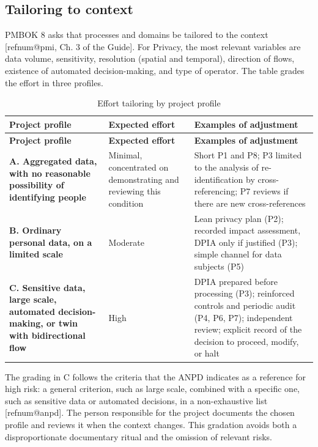 \documentclass[11pt,a4paper]{article}
\makeatletter
\newcommand{\refnum}[1]{\csname refnum@#1\endcsname}
\newcommand{\cit}[1]{[\refnum{#1}]}
\newcommand{\SingleSpacing}{}
\newcommand{\fontetab}[1]{\par\vspace{3pt}{\small\noindent Source: #1\par}}
\makeatother
\begin{document}
\subsection{Tailoring to context}

PMBOK 8 asks that processes and domains be tailored to the context [\refnum{pmi}, Ch. 3 of the Guide]. For Privacy, the most relevant variables are data volume, sensitivity, resolution (spatial and temporal), direction of flows, existence of automated decision-making, and type of operator. The table grades the effort in three profiles.

\begingroup\SingleSpacing\small
\begin{longtable}{@{}>{\raggedright\arraybackslash}p{}>{\raggedright\arraybackslash}p{}>{\raggedright\arraybackslash}p{}@{}}
\caption{Effort tailoring by project profile}\label{tab:t5}\\
\toprule
\textbf{Project profile} & \textbf{Expected effort} & \textbf{Examples of adjustment}\\
\midrule
\endfirsthead
\toprule
\textbf{Project profile} & \textbf{Expected effort} & \textbf{Examples of adjustment}\\
\midrule
\endhead
\bottomrule
\endfoot
\bottomrule
\endlastfoot
\textbf{A. Aggregated data, with no reasonable possibility of identifying people} & Minimal, concentrated on demonstrating and reviewing this condition & Short P1 and P8; P3 limited to the analysis of re-identification by cross-referencing; P7 reviews if there are new cross-references\\[3pt]
\textbf{B. Ordinary personal data, on a limited scale} & Moderate & Lean privacy plan (P2); recorded impact assessment, DPIA only if justified (P3); simple channel for data subjects (P5)\\[3pt]
\textbf{C. Sensitive data, large scale, automated decision-making, or twin with bidirectional flow} & High & DPIA prepared before processing (P3); reinforced controls and periodic audit (P4, P6, P7); independent review; explicit record of the decision to proceed, modify, or halt\\[3pt]
\end{longtable}
\endgroup
\fontetab{Prepared by the authors (2026), based on \cit{anpd}.}

The grading in C follows the criteria that the ANPD indicates as a reference for high risk: a general criterion, such as large scale, combined with a specific one, such as sensitive data or automated decisions, in a non-exhaustive list [\refnum{anpd}]. The person responsible for the project documents the chosen profile and reviews it when the context changes. This gradation avoids both a disproportionate documentary ritual and the omission of relevant risks.
\end{document}
